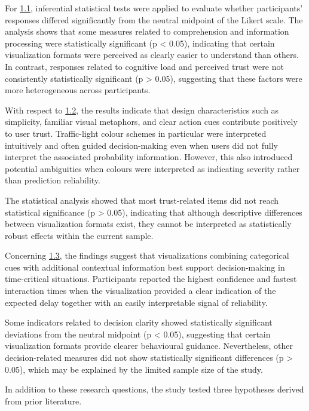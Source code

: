 \documentclass[final,journal,a4paper]{IEEEtran}
\begin{document}
For \hyperlink{rq:1.1}{1.1}, inferential statistical tests were applied to evaluate whether participants’ responses differed significantly from the neutral midpoint of the Likert scale. The analysis shows that some measures related to comprehension and information processing were statistically significant (p < 0.05), indicating that certain visualization formats were perceived as clearly easier to understand than others. In contrast, responses related to cognitive load and perceived trust were not consistently statistically significant (p > 0.05), suggesting that these factors were more heterogeneous across participants.

With respect to \hyperlink{rq:1.2}{1.2}, the results indicate that design characteristics such as simplicity, familiar visual metaphors, and clear action cues contribute positively to user trust. Traffic-light colour schemes in particular were interpreted intuitively and often guided decision-making even when users did not fully interpret the associated probability information. However, this also introduced potential ambiguities when colours were interpreted as indicating severity rather than prediction reliability.

The statistical analysis showed that most trust-related items did not reach statistical significance (p > 0.05), indicating that although descriptive differences between visualization formats exist, they cannot be interpreted as statistically robust effects within the current sample.

Concerning \hyperlink{rq:1.3}{1.3}, the findings suggest that visualizations combining categorical cues with additional contextual information best support decision-making in time-critical situations. Participants reported the highest confidence and fastest interaction times when the visualization provided a clear indication of the expected delay together with an easily interpretable signal of reliability.

Some indicators related to decision clarity showed statistically significant deviations from the neutral midpoint (p < 0.05), suggesting that certain visualization formats provide clearer behavioural guidance. Nevertheless, other decision-related measures did not show statistically significant differences (p > 0.05), which may be explained by the limited sample size of the study.

In addition to these research questions, the study tested three hypotheses derived from prior literature.
\end{document}
